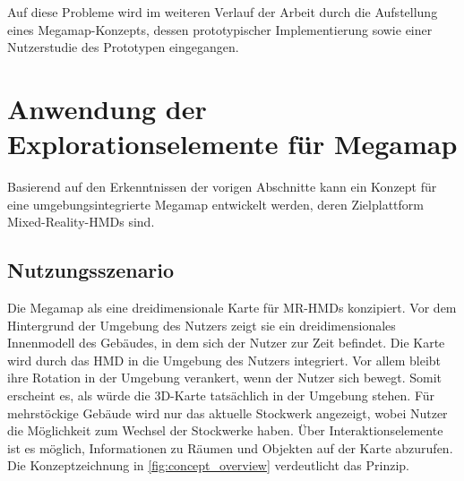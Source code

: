 Auf diese Probleme wird im weiteren Verlauf der Arbeit durch die Aufstellung eines Megamap-Konzepts, dessen prototypischer Implementierung sowie einer Nutzerstudie des Prototypen eingegangen.

\section{Anwendung der Explorationselemente für Megamap}
Basierend auf den Erkenntnissen der vorigen Abschnitte kann ein Konzept für eine umgebungsintegrierte Megamap entwickelt werden, deren Zielplattform Mixed-Reality-HMDs sind.

\subsection{Nutzungsszenario}
Die Megamap als eine dreidimensionale Karte für MR-HMDs konzipiert.
Vor dem Hintergrund der Umgebung des Nutzers zeigt sie ein dreidimensionales Innenmodell des Gebäudes, in dem sich der Nutzer zur Zeit befindet.
Die Karte wird durch das HMD in die Umgebung des Nutzers integriert.
Vor allem bleibt ihre Rotation in der Umgebung verankert, wenn der Nutzer sich bewegt.
Somit erscheint es, als würde die 3D-Karte tatsächlich in der Umgebung stehen.
Für mehrstöckige Gebäude wird nur das aktuelle Stockwerk angezeigt, wobei Nutzer die Möglichkeit zum Wechsel der Stockwerke haben.
Über Interaktionselemente ist es möglich, Informationen zu Räumen und Objekten auf der Karte abzurufen.
Die Konzeptzeichnung in \autoref{fig:concept_overview} verdeutlicht das Prinzip.

